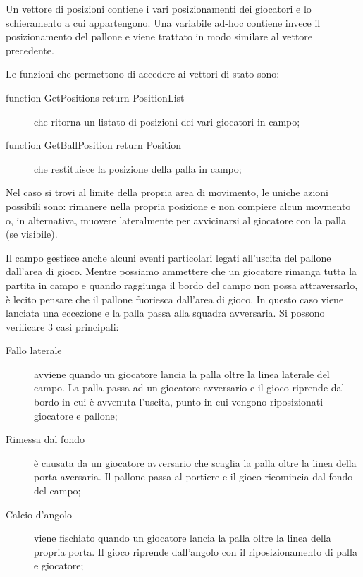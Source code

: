 \documentclass[aps,letterpaper,10pt]{article}
\begin{document}
Un vettore di posizioni contiene i vari posizionamenti dei giocatori e lo schieramento a cui appartengono. Una variabile
ad-hoc contiene invece il posizionamento del pallone e viene trattato in modo similare al vettore precedente.
\vspace{3mm}

Le funzioni che permettono di accedere ai vettori di stato sono:

\begin{description}
	\item[function GetPositions return PositionList] che ritorna un listato di posizioni dei vari giocatori in campo;
	\item[function GetBallPosition return Position] che restituisce la posizione della palla in campo;
\end{description}

Nel caso si trovi al limite della propria area di movimento, le uniche azioni possibili sono: rimanere nella propria
posizione e non compiere alcun movmento o, in alternativa, muovere lateralmente per avvicinarsi al giocatore con la
palla (se visibile). \vspace{3mm}

Il campo gestisce anche alcuni eventi particolari legati all'uscita del pallone dall'area di gioco. Mentre possiamo
ammettere che un giocatore rimanga tutta la partita in campo e quando raggiunga il bordo del campo non possa
attraversarlo, \`e lecito pensare che il pallone fuoriesca dall'area di gioco. In questo caso viene lanciata una
eccezione e la palla passa alla squadra avversaria. Si possono verificare 3 casi principali:

\begin{description}
\item[Fallo laterale] avviene quando un giocatore lancia la palla oltre la linea laterale del campo. La palla passa ad
un giocatore avversario e il gioco riprende dal bordo in cui \`e avvenuta l'uscita, punto in cui vengono riposizionati
giocatore e pallone;
\item[Rimessa dal fondo] \`e causata da un giocatore avversario che scaglia la palla oltre la linea della porta
aversaria. Il pallone passa al portiere e il gioco ricomincia dal fondo del campo;
\item[Calcio d'angolo] viene fischiato quando un giocatore lancia la palla oltre la linea della propria porta. Il gioco
riprende dall'angolo con il riposizionamento di palla e giocatore;
\end{description}
\end{document}
